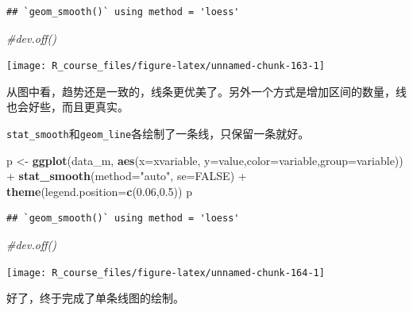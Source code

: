 \documentclass[]{article}
\newenvironment{Shaded}{\begin{snugshade}}{\end{snugshade}}
\newcommand{\KeywordTok}[1]{\textcolor[rgb]{0.13,0.29,0.53}{\textbf{{#1}}}}
\newcommand{\DataTypeTok}[1]{\textcolor[rgb]{0.13,0.29,0.53}{{#1}}}
\newcommand{\FloatTok}[1]{\textcolor[rgb]{0.00,0.00,0.81}{{#1}}}
\newcommand{\StringTok}[1]{\textcolor[rgb]{0.31,0.60,0.02}{{#1}}}
\newcommand{\CommentTok}[1]{\textcolor[rgb]{0.56,0.35,0.01}{\textit{{#1}}}}
\newcommand{\OtherTok}[1]{\textcolor[rgb]{0.56,0.35,0.01}{{#1}}}
\newcommand{\NormalTok}[1]{{#1}}
\numberwithin{figure}{section}
\numberwithin{table}{section}
\theoremstyle{definition}
\theoremstyle{definition}
\theoremstyle{definition}
\theoremstyle{remark}
\begin{document}
\begin{verbatim}
## `geom_smooth()` using method = 'loess'
\end{verbatim}

\begin{Shaded}
\begin{Highlighting}[]
\CommentTok{#dev.off()}
\end{Highlighting}
\end{Shaded}

\begin{center}\texttt{[image: R\_course\_files/figure-latex/unnamed-chunk-163-1]} \end{center}

从图中看，趋势还是一致的，线条更优美了。另外一个方式是增加区间的数量，线也会好些，而且更真实。

\texttt{stat\_smooth}和\texttt{geom\_line}各绘制了一条线，只保留一条就好。

\begin{Shaded}
\begin{Highlighting}[]
\NormalTok{p <-}\StringTok{ }\KeywordTok{ggplot}\NormalTok{(data_m, }\KeywordTok{aes}\NormalTok{(}\DataTypeTok{x=}\NormalTok{xvariable, }\DataTypeTok{y=}\NormalTok{value,}\DataTypeTok{color=}\NormalTok{variable,}\DataTypeTok{group=}\NormalTok{variable)) +}\StringTok{ }
\StringTok{     }\KeywordTok{stat_smooth}\NormalTok{(}\DataTypeTok{method=}\StringTok{"auto"}\NormalTok{, }\DataTypeTok{se=}\OtherTok{FALSE}\NormalTok{) +}\StringTok{ }\KeywordTok{theme}\NormalTok{(}\DataTypeTok{legend.position=}\KeywordTok{c}\NormalTok{(}\FloatTok{0.06}\NormalTok{,}\FloatTok{0.5}\NormalTok{))}
\NormalTok{p}
\end{Highlighting}
\end{Shaded}

\begin{verbatim}
## `geom_smooth()` using method = 'loess'
\end{verbatim}

\begin{Shaded}
\begin{Highlighting}[]
\CommentTok{#dev.off()}
\end{Highlighting}
\end{Shaded}

\begin{center}\texttt{[image: R\_course\_files/figure-latex/unnamed-chunk-164-1]} \end{center}

好了，终于完成了单条线图的绘制。
\end{document}
